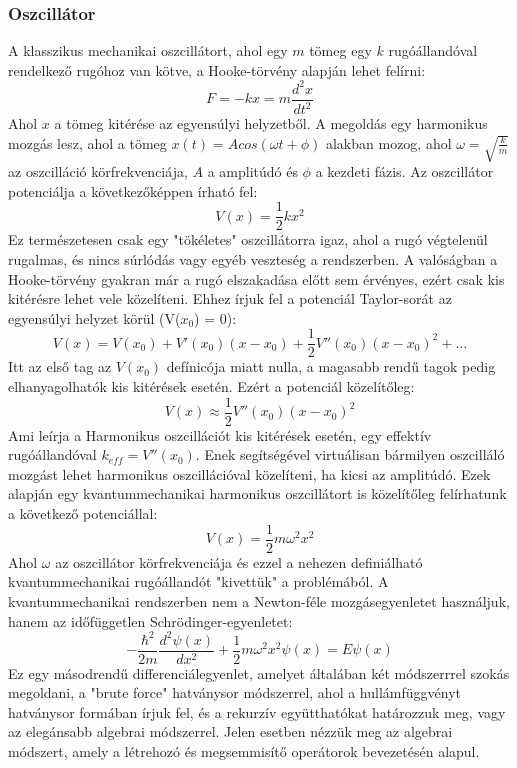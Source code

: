 \documentclass[../main.tex]{subfiles}
\begin{document}
\subsubsection{Oszcillátor}
A klasszikus mechanikai oszcillátort, ahol egy  $m$ tömeg egy  $k$ rugóállandóval rendelkező rugóhoz van kötve,
a Hooke-törvény alapján lehet felírni:
\begin{equation}
    F = - k x = m \frac{d^2 x}{dt^2}
\end{equation}
Ahol $x$ a tömeg kitérése az egyensúlyi helyzetből. A megoldás egy harmonikus mozgás lesz, ahol a tömeg $x(t) = A cos(\omega t + \phi)$ alakban mozog,
ahol $\omega = \sqrt{\frac{k}{m}}$ az oszcilláció körfrekvenciája, $A$ a amplitúdó és $\phi$ a kezdeti fázis. Az oszcillátor potenciálja a következőképpen írható fel:
\begin{equation}
    V(x) = \frac{1}{2} k x^2
\end{equation}
Ez természetesen csak egy "tökéletes" oszcillátorra igaz, ahol a rugó végtelenül rugalmas, és nincs súrlódás vagy egyéb veszteség a rendszerben.
A valóságban a Hooke-törvény gyakran már a rugó elszakadása előtt sem érvényes, ezért csak kis kitérésre lehet vele közelíteni. 
Ehhez írjuk fel a potenciál Taylor-sorát az egyensúlyi helyzet körül (V($x_0$) = 0):
\begin{equation}
    V(x) = V(x_0) + V'(x_0) (x - x_0) + \frac{1}{2} V''(x_0) (x - x_0)^2 + \ldots
\end{equation}
Itt az első tag az $V(x_0)$ defínicója miatt nulla, a magasabb rendű tagok pedig elhanyagolhatók kis kitérések esetén. Ezért a potenciál közelítőleg:
\begin{equation}
    V(x) \approx \frac{1}{2} V''(x_0) (x - x_0)^2
\end{equation}
Ami leírja a Harmonikus oszcillációt kis kitérések esetén, egy effektív rugóállandóval $k_{eff} = V''(x_0)$. Enek segítségével
virtuálisan bármilyen oszcilláló mozgást lehet harmonikus oszcillációval közelíteni, ha kicsi az amplitúdó. 
\newline
\newline
Ezek alapján egy kvantummechanikai harmonikus oszcillátort is közelítőleg felírhatunk a következő potenciállal:
\begin{equation}
    V(x) = \frac{1}{2} m \omega^2 x^2
\end{equation}
Ahol $\omega$ az oszcillátor körfrekvenciája és ezzel a nehezen definiálható kvantummechanikai rugóállandót "kivettük" a problémából.
A kvantummechanikai rendszerben nem a Newton-féle mozgásegyenletet használjuk, hanem az időfüggetlen Schrödinger-egyenletet:
\begin{equation}
    -\frac{\hbar^2}{2m} \frac{d^2 \psi(x)}{dx^2} + \frac{1}{2} m \omega^2 x^2 \psi(x) = E \psi(x)
\end{equation}
Ez egy másodrendű differenciálegyenlet, amelyet általában két módszerrrel szokás megoldani, a "brute force" hatványsor módszerrel,
ahol a hullámfüggvényt hatványsor formában írjuk fel, és a rekurzív együtthatókat határozzuk meg, vagy az elegánsabb algebrai módszerrel.
Jelen esetben nézzük meg az algebrai módszert, amely a létrehozó és megsemmisítő operátorok bevezetésén alapul.
\end{document}
